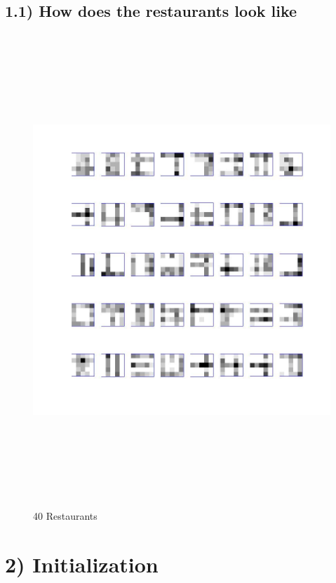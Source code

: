 \documentclass{article}
\begin{document}
\begin{spacing}{1.1}
\subsection{1.1) How does the restaurants look like}
\begin{figure}
    \centering 
    \includegraphics[width=7in,height=7in]{restau.jpg} 
    \caption{40 Restaurants}
\end{figure}

\section{2) Initialization}

\end{spacing}
\end{document}
